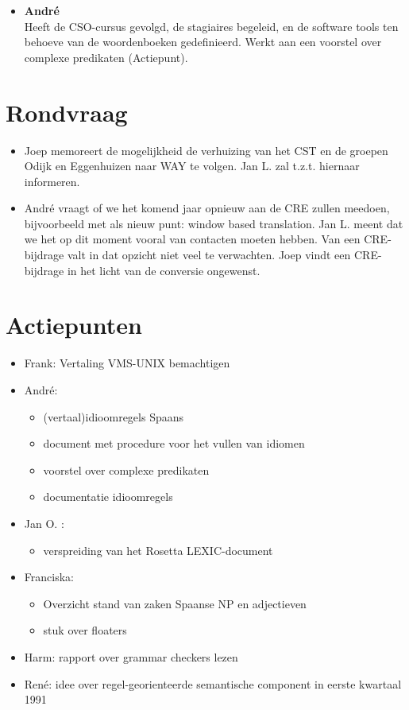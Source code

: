 \begin{enumerate}
\begin{itemize}
  \item {\bf Andr\'{e}}\\
Heeft de CSO-cursus gevolgd, de stagiaires begeleid, en de 
software tools ten behoeve van de woordenboeken gedefinieerd.
Werkt aan een voorstel over complexe predikaten (Actiepunt). 

\end{itemize}

\section{Rondvraag}
\begin{itemize}
  \item
Joep memoreert de mogelijkheid de verhuizing van het CST en de groepen 
Odijk en Eggenhuizen naar WAY te volgen. Jan L. zal t.z.t. hiernaar 
informeren. 
  \item 
Andr\'{e} vraagt of we het komend jaar opnieuw aan de CRE zullen meedoen, 
bijvoorbeeld met als nieuw punt: window based translation.
Jan L. meent dat we het op dit moment vooral van contacten moeten hebben. Van 
een 
CRE-bijdrage valt in dat opzicht niet veel te verwachten.
Joep vindt een CRE-bijdrage in het licht van de conversie ongewenst.

\end{itemize}



\section{Actiepunten}
\begin{itemize}
  \item Frank: Vertaling VMS-UNIX bemachtigen 
  \item Andr\'{e}: 
\begin{itemize}
  \item (vertaal)idioomregels Spaans
  \item document met procedure voor het vullen van idiomen
  \item voorstel over complexe predikaten 
  \item documentatie idioomregels
\end{itemize}
\item Jan O. :
\begin{itemize}
  \item verspreiding van het Rosetta LEXIC-document
\end{itemize}

  \item Franciska:
\begin{itemize}
  \item Overzicht stand van zaken Spaanse NP en adjectieven
  \item stuk over floaters
\end{itemize}
  \item Harm: rapport over grammar checkers lezen
  \item Ren\'{e}: idee over regel-georienteerde semantische component in eerste 
kwartaal 1991
\end{itemize}


\end{enumerate}
